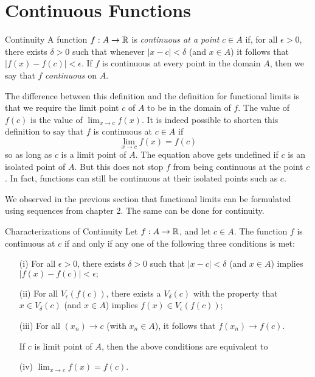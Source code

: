 \section{Continuous Functions}

\begin{definition}{Continuity}{}
    A function \( f: A \to \mathbb{R}  \) is \textit{continuous at a point} \( c \in A  \) if, for all \( \epsilon > 0  \), there exists \( \delta > 0  \) such that whenever \( | x - c  | < \delta \) (and \( x \in A  \)) it follows that \( | f(x) - f(c) | < \epsilon  \). 
    If \( f \) is continuous at every point in the domain \( A  \), then we say that \( f \) \textit{continuous} on \( A  \).
    \end{definition}

The difference between this definition and the definition for functional limits is that we require the limit point \( c  \) of \( A  \) to be in the domain of \(  f\). The value of \( f(c) \) is the value of \( \lim_{ x \to c } f(x)  \). It is indeed possible to shorten this definition to say that \( f  \) is continuous at \( c \in A  \) if 
\[  \lim_{ x \to c } f(x) = f(c) \tag{1}\]
so as long as \( c  \) is a limit point of \( A  \). The equation above gets undefined if \( c \) is an isolated point of \( A  \). But this does not stop \( f \) from being continuous at the point \( c \). In fact, functions can still be continuous at their isolated points such as \( c \).

We observed in the previous section that functional limits can be formulated using sequences from chapter 2. The same can be done for continuity. 

\begin{theorem}{Characterizations of Continuity}{}
    Let \( f: A \to \mathbb{R}  \), and let \( c \in A  \). The function \( f \) is continuous at \( c \) if and only if any one of the following three conditions is met:
    \begin{enumerate}
        \item[(i)] For all \( \epsilon > 0  \), there exists \( \delta > 0  \) such that \( | x - c  | < \delta \) (and \( x \in A  \)) implies \( | f(x) - f(c) | < \epsilon; \)
        \item[(ii)] For all \( V_{\epsilon }(f(c)) \), there exists a \( V_{\delta}(c)  \) with the property that \( x \in V_{\delta} (c) \) (and \( x \in A  \)) implies \( f(x) \in V_{\epsilon }(f(c))  \);
        \item[(iii)] For all \( (x_n) \to c \) (with \( x_n \in A
            \)), it follows that \( f(x_n) \to f(c) \).

            If \( c \) is limit point of \( A  \), then the above conditions are equivalent to 
    \item[(iv)] \( \lim_{ x \to c } f(x)  = f(c)\).
    \end{enumerate}
    \end{theorem}

